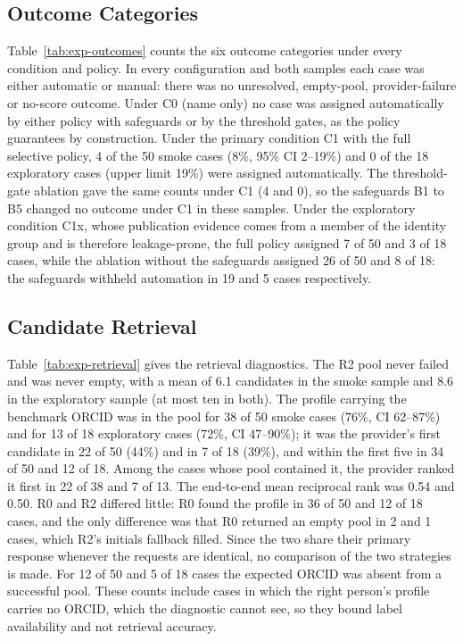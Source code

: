 \subsection{Outcome Categories}
\label{sec:res-outcomes}

Table~\ref{tab:exp-outcomes} counts the six outcome categories under every condition and policy. In every configuration and both samples each case was either automatic or manual: there was no unresolved, empty-pool, provider-failure or no-score outcome. Under C0 (name only) no case was assigned automatically by either policy with safeguards or by the threshold gates, as the policy guarantees by construction. Under the primary condition C1 with the full selective policy, 4 of the 50 smoke cases (8\%, 95\% CI 2--19\%) and 0 of the 18 exploratory cases (upper limit 19\%) were assigned automatically. The threshold-gate ablation gave the same counts under C1 (4 and 0), so the safeguards B1 to B5 changed no outcome under C1 in these samples. Under the exploratory condition C1x, whose publication evidence comes from a member of the identity group and is therefore leakage-prone, the full policy assigned 7 of 50 and 3 of 18 cases, while the ablation without the safeguards assigned 26 of 50 and 8 of 18: the safeguards withheld automation in 19 and 5 cases respectively.

\subsection{Candidate Retrieval}
\label{sec:res-retrieval}

Table~\ref{tab:exp-retrieval} gives the retrieval diagnostics. The R2 pool never failed and was never empty, with a mean of 6.1 candidates in the smoke sample and 8.6 in the exploratory sample (at most ten in both). The profile carrying the benchmark ORCID was in the pool for 38 of 50 smoke cases (76\%, CI 62--87\%) and for 13 of 18 exploratory cases (72\%, CI 47--90\%); it was the provider's first candidate in 22 of 50 (44\%) and in 7 of 18 (39\%), and within the first five in 34 of 50 and 12 of 18. Among the cases whose pool contained it, the provider ranked it first in 22 of 38 and 7 of 13. The end-to-end mean reciprocal rank was 0.54 and 0.50. R0 and R2 differed little: R0 found the profile in 36 of 50 and 12 of 18 cases, and the only difference was that R0 returned an empty pool in 2 and 1 cases, which R2's initials fallback filled. Since the two share their primary response whenever the requests are identical, no comparison of the two strategies is made. For 12 of 50 and 5 of 18 cases the expected ORCID was absent from a successful pool. These counts include cases in which the right person's profile carries no ORCID, which the diagnostic cannot see, so they bound label availability and not retrieval accuracy.

